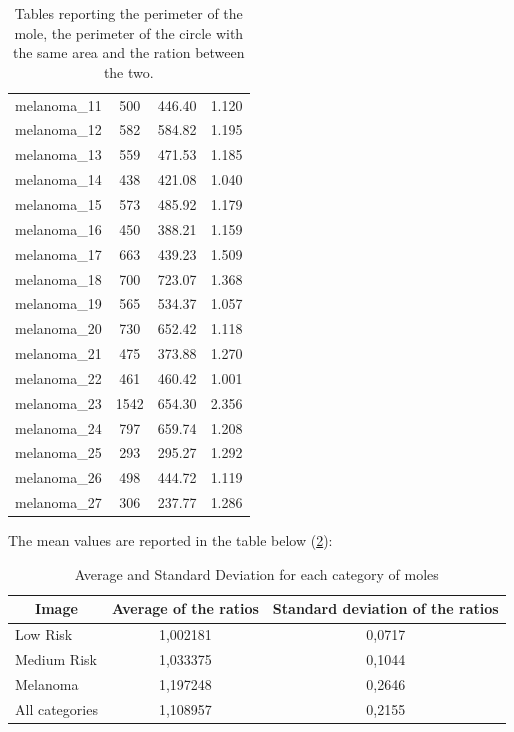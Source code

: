 \documentclass[a4paper,12pt,oneside,titlepage]{article}
\begin{document}
\begin{table}[H]
\begin{minipage}[b]{0.1\linewidth}
\begin{tabular}{|c|c|c|c|}
				melanoma\_11                        &500   &446.40   &1.120\\
				melanoma\_12                        &582   &584.82   &1.195\\
				melanoma\_13                        &559   &471.53   &1.185\\
				melanoma\_14                        &438   &421.08   &1.040\\
				melanoma\_15                        &573   &485.92   &1.179\\
				melanoma\_16                        &450   &388.21   &1.159\\
				melanoma\_17                        &663   &439.23   &1.509\\
				melanoma\_18                        &700   &723.07   &1.368\\
				melanoma\_19                        &565   &534.37   &1.057\\
				melanoma\_20                        &730   &652.42   &1.118\\
				melanoma\_21                        &475   &373.88   &1.270\\
				melanoma\_22                        &461   &460.42   &1.001\\
				melanoma\_23                        &1542&654.30 &2.356\\
				melanoma\_24                        &797   &659.74   &1.208\\
				melanoma\_25                        &293   &295.27   &1.292\\
				melanoma\_26                        &498   &444.72   &1.119\\
				melanoma\_27                        &306   &237.77   &1.286\\
				\hline
			\end{tabular}
		\end{minipage}
		\caption{Tables reporting the perimeter of the mole, the perimeter of the circle with the same area and the ration between the two.}
		\label{table1}
	\end{table}
	
	The mean values are reported in the table below (\ref{table2}):
	
	\begin{table}[H]\footnotesize
		\centering
		\begin{tabular}{|l|c|c|}
			\hline
			\multicolumn{1}{|c|}{\textbf{Image}} & \textbf{Average of the ratios} & \textbf{Standard deviation of the ratios} \\ \hline
			Low Risk & 1,002181 & 0,0717 \\
			Medium Risk & 1,033375 & 0,1044 \\
			Melanoma & 1,197248 & 0,2646 \\ \hline
			All categories & 1,108957 & 0,2155 \\ \hline
		\end{tabular}
		\label{table2}
		\caption{Average and Standard Deviation for each category of moles}
		
	\end{table}
	
\end{document}
